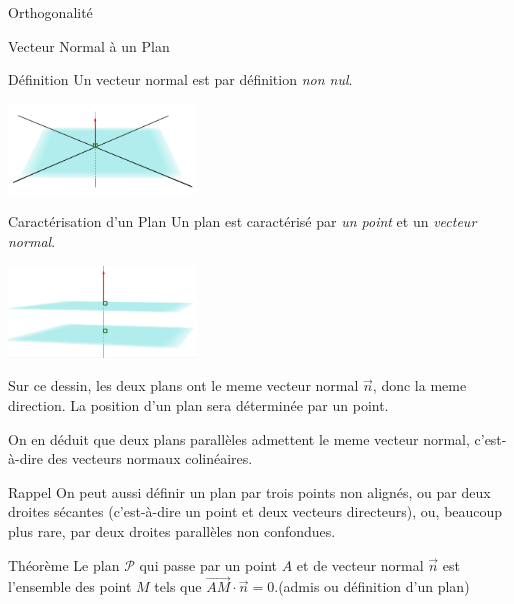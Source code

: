 \documentclass{coursbook}
\begin{document}
\begin{Gpartie}{Orthogonalité}
\begin{Spartie}{Vecteur Normal à un Plan}
\begin{SSpartie}{Définition}
                Un vecteur normal est par définition \emph{non nul}.
    
                \begin{center}
                        \includegraphics[width=5cm]{rsc/12fig3.png}
                    \parbox{\linewidth}{}
                \end{center}
            \end{SSpartie}
            \pagebreak
            \begin{SSpartie}{Caractérisation d'un Plan}
                Un plan est caractérisé par \emph{un point} et un \emph{vecteur normal}.

                \begin{center}
                    \includegraphics[width=5cm]{rsc/12fig4.png}
                    \parbox{\linewidth}{}
                \end{center}
                
                                    Sur ce dessin, les deux plans ont le meme vecteur normal $\vec{n}$, donc la meme direction. La position d'un plan sera déterminée par un point.
                
                                    On en déduit que deux plans parallèles admettent le meme vecteur normal, c'est-à-dire des vecteurs normaux colinéaires.
                \begin{SSSpartie}{Rappel} 
                    On peut aussi définir un plan par trois points non alignés, ou par deux droites sécantes (c'est-à-dire un point et deux vecteurs directeurs), ou, beaucoup plus rare, par deux droites parallèles non confondues.
                \end{SSSpartie}
            \end{SSpartie}
            \begin{SSpartie}{Théorème} 
                Le plan $\mathcal{P}$ qui passe par un point $A$ et de vecteur normal $\vec{n}$ est l'ensemble des point $M$ tels que $\overrightarrow{AM}\cdot\vec{n}=0$.\quad (admis ou définition d'un plan)


\end{SSpartie}
\end{Spartie}
\end{Gpartie}
\end{document}
